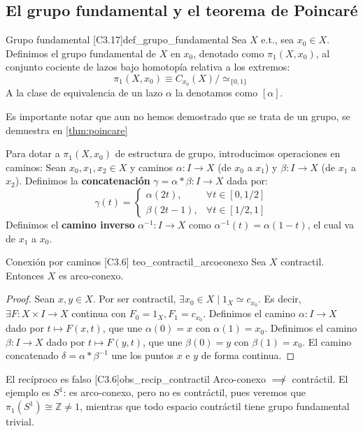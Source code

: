\subsection{El grupo fundamental y el teorema de Poincaré}

\begin{definicion}{Grupo fundamental [C3.17]}{def_grupo_fundamental}
Sea $X$ e.t., sea $x_0 \in X$. Definimos el grupo fundamental de $X$ en $x_0$, denotado como $\pi_1(X, x_0)$, al conjunto cociente de lazos bajo homotopía relativa a los extremos:
\[ \pi_1(X, x_0) \equiv C_{x_0}(X) / \simeq_{\{0,1\}} \]
A la clase de equivalencia de un lazo $\alpha$ la denotamos como $[\alpha]$.

Es importante notar que aun no hemos demostrado que se trata de un grupo, se demuestra en \cref{thm:poincare}
\end{definicion}

Para dotar a $\pi_1(X, x_0)$ de estructura de grupo, introducimos operaciones en caminos:
Sean $x_0, x_1, x_2 \in X$ y caminos $\alpha \colon I \to X$ (de $x_0$ a $x_1$) y $\beta \colon I \to X$ (de $x_1$ a $x_2$).
Definimos la \textbf{concatenación} $\gamma = \alpha * \beta \colon I \to X$ dada por:
\[ \gamma(t) = \begin{cases} \alpha(2t), & \forall t \in [0, 1/2] \\ \beta(2t-1), & \forall t \in [1/2, 1] \end{cases} \]
Definimos el \textbf{camino inverso} $\alpha^{-1} \colon I \to X$ como $\alpha^{-1}(t) = \alpha(1-t)$, el cual va de $x_1$ a $x_0$.

\begin{teorema}{Conexión por caminos [C3.6] \marcaT}{teo_contractil_arcoconexo}
Sea $X$ contractil. Entonces $X$ es arco-conexo.
\end{teorema}
\begin{proof}
Sean $x, y \in X$. Por ser contractil, $\exists x_0 \in X \mid 1_X \simeq c_{x_0}$. Es decir, $\exists F \colon X \times I \to X$ continua con $F_0 = 1_X, F_1 = c_{x_0}$.
Definimos el camino $\alpha \colon I \to X$ dado por $t \mapsto F(x,t)$, que une $\alpha(0)=x$ con $\alpha(1)=x_0$.
Definimos el camino $\beta \colon I \to X$ dado por $t \mapsto F(y,t)$, que une $\beta(0)=y$ con $\beta(1)=x_0$.
El camino concatenado $\delta = \alpha * \beta^{-1}$ une los puntos $x$ e $y$ de forma continua.
\end{proof}

\begin{observacion}{El recíproco es falso [C3.6]}{obs_recip_contractil}
Arco-conexo $\not\implies$ contráctil. El ejemplo es $S^1$: es arco-conexo, pero no es contráctil, pues veremos que $\pi_1(S^1) \cong \mathbb{Z} \neq 1$, mientras que todo espacio contráctil tiene grupo fundamental trivial.
\end{observacion}

